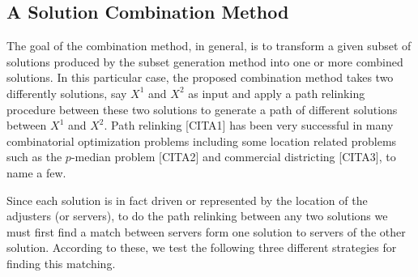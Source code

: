 \subsection{A Solution Combination Method}
The goal of the combination method,
in general,
is to transform a given subset of solutions
produced by the subset generation method
into one or more combined solutions.
In this particular case,
the proposed combination method
takes two differently solutions,
say $X^1$ and $X^2$ as input
and apply a path relinking procedure
between these two solutions
to generate a path of different solutions
between $X^1$ and $X^2$.
Path relinking [CITA1] 
has been very successful
in many combinatorial optimization problems
including some location related problems
such as the $p$-median problem [CITA2] 
and commercial districting [CITA3], to name a few. 

Since each solution is in fact driven or represented
by the location of the adjusters (or servers),
to do the path relinking between any two solutions
we must first find a match between servers
form one solution to servers of the other solution.
According to these,
we test the following three different strategies
for finding this matching.

